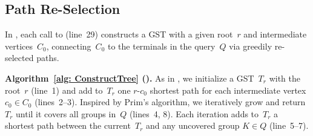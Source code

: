 \subsection{Path Re-Selection}
\label{subsec: sec_rebuild}

In \Improved, each call to \ConstructTree (line~29) constructs a GST with a given root~$r$ and intermediate vertices~$C_0$, connecting~$C_0$ to the terminals in the query~$Q$ via greedily re-selected paths.

\textbf{Algorithm~\ref{alg: ConstructTree} (\ConstructTree).}
As in \Basic, we initialize a GST~$T_r$ with the root~$r$ (line~1) and add to~$T_r$ one $r$-$c_0$ shortest path for each intermediate vertex $c_0 \in C_0$ (lines~2--3). Inspired by Prim's algorithm, we iteratively grow and return~$T_r$ until it covers all groups in~$Q$ (lines~4, 8). Each iteration adds to~$T_r$ a shortest path between the current~$T_r$ and any uncovered group $K \in Q$ (line~5--7).





